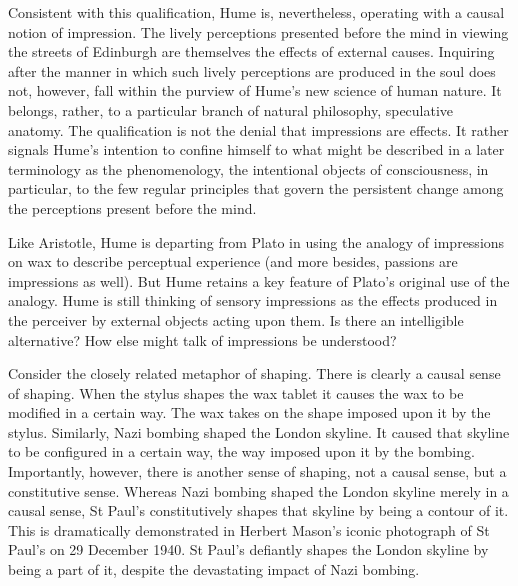 Consistent with this qualification, Hume is, nevertheless, operating with a causal notion of impression. The lively perceptions presented before the mind in viewing the streets of Edinburgh are themselves the effects of external causes. Inquiring after the manner in which such lively perceptions are produced in the soul does not, however, fall within the purview of Hume's new science of human nature. It belongs, rather, to a particular branch of natural philosophy, speculative anatomy. The qualification is not the denial that impressions are effects. It rather signals Hume's intention to confine himself to what might be described in a later terminology as the phenomenology, the intentional objects of consciousness, in particular, to the few regular principles that govern the persistent change among the perceptions present before the mind.

Like Aristotle, Hume is departing from Plato in using the analogy of impressions on wax to describe perceptual experience (and more besides, passions are impressions as well). But Hume retains a key feature of Plato's original use of the analogy. Hume is still thinking of sensory impressions as the effects produced in the perceiver by external objects acting upon them. Is there an intelligible alternative? How else might talk of impressions be understood? 

Consider the closely related metaphor of shaping. There is clearly a causal sense of shaping. When the stylus shapes the wax tablet it causes the wax to be modified in a certain way. The wax takes on the shape imposed upon it by the stylus. Similarly, Nazi bombing shaped the London skyline. It caused that skyline to be configured in a certain way, the way imposed upon it by the bombing. Importantly, however, there is another sense of shaping, not a causal sense, but a constitutive sense. Whereas Nazi bombing shaped the London skyline merely in a causal sense, St Paul's constitutively shapes that skyline by being a contour of it. This is dramatically demonstrated in Herbert Mason's iconic photograph of St Paul's on 29 December 1940. St Paul's defiantly shapes the London skyline by being a part of it, despite the devastating impact of Nazi bombing.

